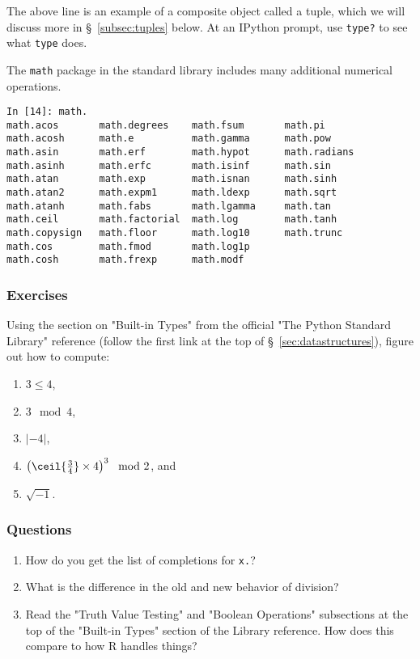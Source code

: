 The above line is an example of a composite object called a tuple, which
we will discuss more in §~\ref{subsec:tuples} below. At an IPython prompt,
use \texttt{type?} to see what \texttt{type} does.

The \texttt{math} package in the standard library includes many additional
numerical operations.

\begin{verbatim}
In [14]: math.
math.acos       math.degrees    math.fsum       math.pi
math.acosh      math.e          math.gamma      math.pow
math.asin       math.erf        math.hypot      math.radians
math.asinh      math.erfc       math.isinf      math.sin
math.atan       math.exp        math.isnan      math.sinh
math.atan2      math.expm1      math.ldexp      math.sqrt
math.atanh      math.fabs       math.lgamma     math.tan
math.ceil       math.factorial  math.log        math.tanh
math.copysign   math.floor      math.log10      math.trunc
math.cos        math.fmod       math.log1p      
math.cosh       math.frexp      math.modf
\end{verbatim}

\subsubsection{Exercises}
Using the section on "Built-in Types" from the official "The Python
Standard Library" reference (follow the first link at the top
of §~\ref{sec:datastructures}), figure out how to compute:
\begin{enumerate}
\item $3 \le 4$,
\item $3 \mod 4$,
\item $|-4|$,
\item $\left(\ceil{\frac{3}{4}}\times4\right)^3 \mod{2}$, and
\item $\sqrt{-1}$.
\end{enumerate}

\subsubsection{Questions}
\begin{enumerate}
\item How do you get the list of completions for \texttt{x.}?
\item What is the difference in the old and new behavior of division?
\item Read the "Truth Value Testing" and "Boolean Operations" subsections
  at the top of the "Built-in Types" section of the Library reference.
  How does this compare to how R handles things?
\end{enumerate}

